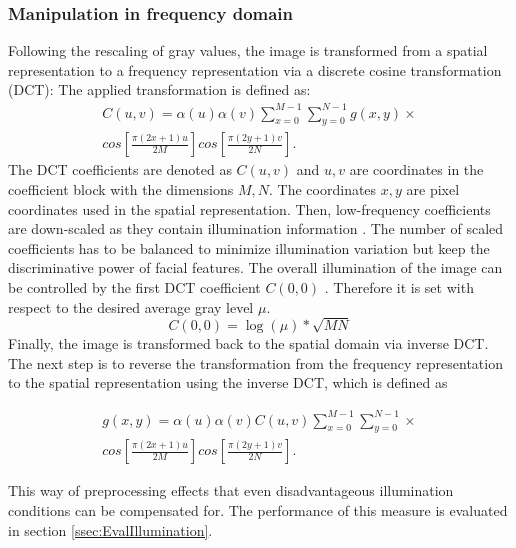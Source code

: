 \subsubsection{Manipulation in frequency domain}
Following the rescaling of gray values, the image is transformed from a spatial representation to a frequency representation via a discrete cosine transformation (DCT):
The applied transformation is defined as:
\begin{equation}
  \begin{split}
    C(u,v)=\alpha(u)\alpha(v) \sum^{M-1}_{x=0}\sum^{N-1}_{y=0}g(x,y)\times \\ cos \left[ \frac{\pi(2x+1)u}{2M}\right]cos \left[ \frac{\pi(2y+1)v}{2N}\right].
  \end{split}
\end{equation}
The DCT coefficients are denoted as $C(u,v)$ and $u,v$ are coordinates in the coefficient block with the dimensions $M,N$.
The coordinates $x,y$ are pixel coordinates used in the spatial representation. 
Then, low-frequency coefficients are down-scaled as they contain illumination information \cite{Goel11}.
The number of scaled coefficients has to be balanced to minimize illumination variation 
but keep the discriminative power of facial features.
The overall illumination of the image can be controlled by the first DCT coefficient $C(0,0)$ \cite{liu02}.
Therefore it is set with respect to the desired average gray level $\mu$.
\begin{equation}
  C(0,0)= \log(\mu)*\sqrt{MN}
\end{equation}
Finally, the image is transformed back to the spatial domain via inverse DCT.
The next step is to reverse the transformation from the frequency representation to the spatial representation using the inverse DCT, which is defined as

\begin{equation}
  \begin{split}
    g(x,y)=\alpha(u)\alpha(v)C(u,v) \sum^{M-1}_{x=0}\sum^{N-1}_{y=0}\times \\ cos \left[ \frac{\pi(2x+1)u}{2M}\right]cos \left[ \frac{\pi(2y+1)v}{2N}\right].
  \end{split}
\end{equation}

This way of preprocessing effects that even disadvantageous illumination conditions can be compensated for.
The performance of this measure is evaluated in section \ref{ssec:EvalIllumination}.

